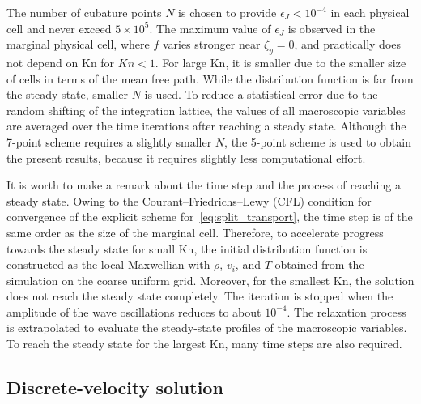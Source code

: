 \documentclass[]{elsarticle} %
\newcommand{\Kn}{\mathrm{Kn}}
\begin{document}
The number of cubature points \(N\) is chosen to provide \(\epsilon_J<10^{-4}\)
in each physical cell and never exceed \(5\times10^5\).
The maximum value of \(\epsilon_J\) is observed in the marginal physical cell,
where \(f\) varies stronger near \(\zeta_y = 0\), and practically does not depend on \(\Kn\) for \(Kn<1\).
For large \(\Kn\), it is smaller due to the smaller size of cells in terms of the mean free path.
While the distribution function is far from the steady state, smaller \(N\) is used.
To reduce a statistical error due to the random shifting of the integration lattice,
the values of all macroscopic variables are averaged over the time iterations
after reaching a steady state.
Although the 7-point scheme requires a slightly smaller \(N\),
the 5-point scheme is used to obtain the present results,
because it requires slightly less computational effort.

It is worth to make a remark about the time step and the process of reaching a steady state.
Owing to the Courant--Friedrichs--Lewy (CFL) condition
for convergence of the explicit scheme for~\eqref{eq:split_transport},
the time step is of the same order as the size of the marginal cell.
Therefore, to accelerate progress towards the steady state for small \(\Kn\),
the initial distribution function is constructed as the local Maxwellian
with \(\rho\), \(v_i\), and \(T\) obtained from the simulation on the coarse uniform grid.
Moreover, for the smallest \(\Kn\), the solution does not reach the steady state completely.
The iteration is stopped when the amplitude of the wave oscillations reduces to about \(10^{-4}\).
The relaxation process is extrapolated to evaluate the steady-state profiles of the macroscopic variables.
To reach the steady state for the largest \(\Kn\), many time steps are also required.

\subsection{Discrete-velocity solution}
\end{document}
